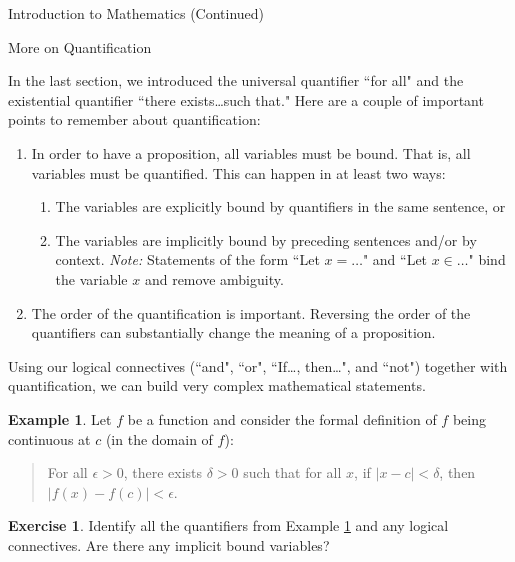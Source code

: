 \documentclass[11pt]{article}
\theoremstyle{definition}
\newtheorem{example}[theorem]{Example}
\newtheorem{exercise}[theorem]{Exercise}
\begin{document}
\addtocounter{section}{0}

\begin{section}{Introduction to Mathematics (Continued)}

\addtocounter{subsection}{4}
\addtocounter{theorem}{74}


\begin{subsection}{More on Quantification}

In the last section, we introduced the universal quantifier ``for all" and the existential quantifier ``there exists\ldots such that."  Here are a couple of important points to remember about quantification:
\begin{enumerate}
\item In order to have a proposition, all variables must be bound.  That is, all variables must be quantified.  This can happen in at least two ways:
\begin{enumerate}
\item The variables are explicitly bound by quantifiers in the same sentence, or
\item The variables are implicitly bound by preceding sentences and/or by context.  \emph{Note:}  Statements of the form ``Let $x=\ldots$" and ``Let $x\in\ldots$" bind the variable $x$ and remove ambiguity.
\end{enumerate}
\item The order of the quantification is important.  Reversing the order of the quantifiers can substantially change the meaning of a proposition.
\end{enumerate}

Using our logical connectives (``and", ``or", ``If\ldots, then\ldots", and ``not") together with quantification, we can build very complex mathematical statements.

\begin{example}\label{ex:def limit}
Let $f$ be a function and consider the formal definition of $f$ being continuous at $c$ (in the domain of $f$):

\begin{quote}
For all $\epsilon >0$, there exists $\delta >0$ such that for all $x$, if $|x-c|<\delta$, then $|f(x)-f(c)|<\epsilon$.
\end{quote}
\end{example}

\begin{exercise}
Identify all the quantifiers from Example \ref{ex:def limit} and any logical connectives.  Are there any implicit bound variables?
\end{exercise}


\end{subsection}
\end{section}
\end{document}
